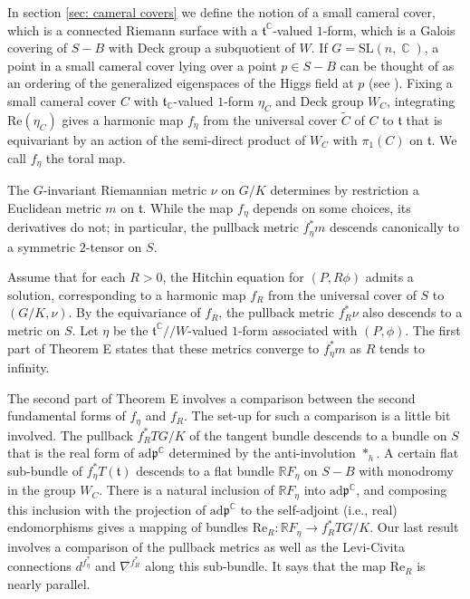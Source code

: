 \documentclass[10pt]{amsart}
\newcommand{\R}{\mathbb R}
\newcommand{\p}{\mathfrak{p}}
\newcommand{\ft}{\mathfrak{t}}
\theoremstyle{definition}
\DeclareMathOperator{\C}{\mathbb{C}}
\begin{document}
In section \ref{sec: cameral covers} we define the notion of a small cameral cover, which is a connected Riemann surface with a $\ft^{\C}$-valued $1$-form, which is a Galois covering of $S-B$ with Deck group a subquotient of $W$. If $G = \mathrm{SL}(n,\C)$, a point in a small cameral cover lying over a point $p \in S-B$ can be thought of as an ordering of the generalized eigenspaces of the Higgs field at $p$ (see \cite[section 3.2]{SS}). Fixing a small cameral cover $C$ with $\ft_{\C}$-valued $1$-form $\eta_C$ and Deck group $W_C$, integrating $\mathrm{Re}(\eta_C)$ gives a harmonic map $f_\eta$ from the universal cover $\tilde{C}$ of $C$ to $\ft$ that is equivariant by an action of the semi-direct product of $W_C$ with $\pi_1(C)$ on $\ft$. We call $f_\eta$ the toral map. 

The $G$-invariant Riemannian metric $\nu$ on $G/K$ determines by restriction a Euclidean metric $m$ on $\ft$. While the map $f_\eta$ depends on some choices, its derivatives do not; in particular, the pullback metric $f_\eta^*m$ descends canonically to a symmetric $2$-tensor on $S$.
 
Assume that for each $R>0$, the Hitchin equation for $(P,R\phi)$ admits a solution, corresponding to a harmonic map $f_R$ from the universal cover of $S$ to $(G/K, \nu)$. By the equivariance of $f_R$, the pullback metric $f_R^*\nu$ also descends to a metric on $S$. Let $\eta$ be the $\ft^{\C}//W$-valued $1$-form associated with $(P,\phi)$. The first part of Theorem E states that these metrics converge to $f_\eta^*m$ as $R$ tends to infinity.

The second part of Theorem E involves a comparison between the second fundamental forms of $f_\eta$ and $f_R$. The set-up for such a comparison is a little bit involved. The pullback $f_R^*TG/K$ of the tangent bundle descends to a bundle on $S$ that is the real form of $\mathrm{ad}\p^{\C}$ determined by the anti-involution $*_h$. A certain flat sub-bundle of $f_\eta^*T(\ft)$ descends to a flat bundle $\R F_\eta$ on $S - B$ with monodromy in the group $W_C$. There is a natural inclusion of $\R F_\eta$ into $\textrm{ad}\p^{\C}$, and composing this inclusion with the projection of $\textrm{ad}\p^{\C}$ to the self-adjoint (i.e., real) endomorphisms gives a mapping of bundles $\textrm{Re}_R: \R F_\eta\to f_R^*TG/K$. Our last result involves a comparison of the pullback metrics as well as the Levi-Civita connections $d^{f_\eta^*}$ and $\nabla^{f_R^*}$ along this sub-bundle. It says that the map $\textrm{Re}_R$ is nearly parallel.
\end{document}
